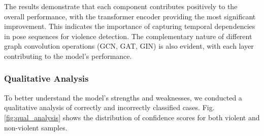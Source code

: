 \documentclass[conference]{IEEEtran}
\begin{document}
The results demonstrate that each component contributes positively to the
overall performance, with the transformer encoder providing the most
significant improvement. This indicates the importance of capturing temporal
dependencies in pose sequences for violence detection. The complementary nature
of different graph convolution operations (GCN, GAT, GIN) is also evident, with
each layer contributing to the model's performance.

\subsubsection{Qualitative Analysis}
To better understand the model's strengths and weaknesses, we conducted a
qualitative analysis of correctly and incorrectly classified cases. Fig.
\ref{fig:qual_analysis} shows the distribution of confidence scores for both
violent and non-violent samples.
\end{document}
